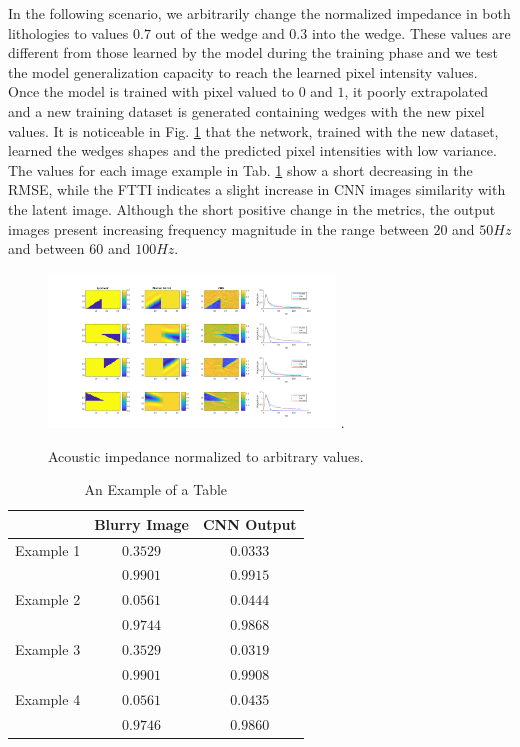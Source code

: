 \documentclass[conference,compsoc]{IEEEtran}
\begin{document}
In the following scenario, we arbitrarily change the normalized impedance in both
lithologies to values $ 0.7 $ out of the wedge and $ 0.3$ into the wedge.
These values are different from those learned by the model during the
training phase and we test the model generalization capacity to reach
the learned pixel intensity values. Once the model is trained with pixel valued to
$ 0 $ and $ 1 $, it poorly extrapolated and a new training dataset is generated
containing wedges with the new pixel values. It is noticeable in
Fig. \ref{fig_scenario2} that the network, trained with the new dataset, learned
the wedges shapes and the predicted pixel intensities with low variance. The values
for each image example in Tab. \ref{table_caso_3} show a short decreasing in the RMSE,
while the FTTI indicates a slight increase in CNN images similarity with the latent image.
Although the short positive change in the metrics, the output images present increasing
frequency magnitude in the range between $ 20 $ and $ 50 Hz $ and between $ 60 $ and $ 100 Hz $.
\begin{figure}[!t]
\centering
\includegraphics[width=3.0in]{Figs/Caso2}
\DeclareGraphicsExtensions.
\caption{Acoustic impedance normalized to arbitrary values.}
\label{fig_scenario2}
\end{figure}

\begin{table}[!t]
\renewcommand{\arraystretch}{1.3}
\caption{An Example of a Table}
\label{table_caso_3}
\centering
\begin{tabular}{|c||c||c|}
\hline
 & Blurry Image & CNN Output \\
\hline
Example 1 & $0.3529$ & $0.0333$\\
\hline
	  & $0.9901$ & $0.9915$\\
\hline
Example 2 & $0.0561$ & $0.0444$ \\
\hline
	  & $0.9744$ & $0.9868$\\
\hline
Example 3 & $0.3529$ & $0.0319$\\
\hline
	  & $0.9901$ & $0.9908$\\
\hline
Example 4 & $0.0561$ & $0.0435$\\
\hline
	  & $0.9746$ & $0.9860$\\
\hline
\end{tabular}
\end{table}
\end{document}
